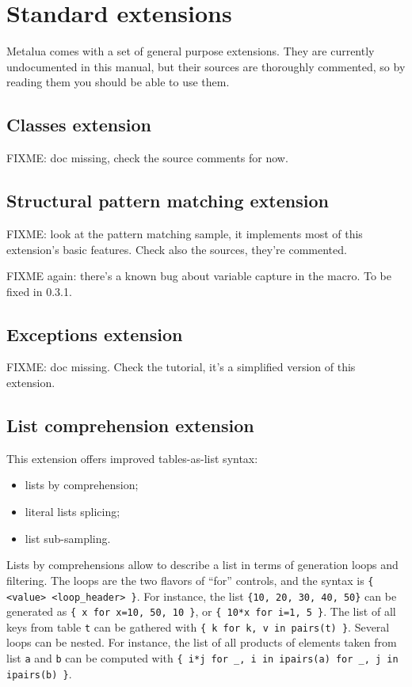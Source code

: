 \section{Standard extensions}
Metalua comes with a set of general purpose extensions. They are
currently undocumented in this manual, but their sources are
thoroughly commented, so by reading them you should be able to use
them.

\subsection{Classes extension}
FIXME: doc missing, check the source comments for now.

\subsection{Structural pattern matching extension}

FIXME: look at the pattern matching sample, it implements most of this
extension's basic features. Check also the sources, they're commented.

FIXME again: there's a known bug about variable capture in the
macro. To be fixed in 0.3.1.

\subsection{Exceptions extension}
FIXME: doc missing. Check the tutorial, it's a simplified version of
this extension.

\subsection{List comprehension extension} 

This extension offers improved tables-as-list syntax:
\begin{itemize}
\item lists by comprehension;
\item literal lists splicing;
\item list sub-sampling.
\end{itemize}

Lists by comprehensions allow to describe a list in terms of
generation loops and filtering. The loops are the two flavors of
``for'' controls, and the syntax is {\tt\{ <value> <loop\_header>
  \}}. For instance, the list {\tt\{10, 20, 30, 40, 50\}} can be generated
as {\tt\{ x for x=10, 50, 10 \}}, or {\tt\{ 10*x for i=1, 5 \}}. The
list of all keys from table {\tt t} can be gathered with {\tt\{ k for
  k, v in pairs(t) \}}. Several loops can be nested. For instance, the
list of all products of elements taken from list {\tt a} and {\tt b}
can be computed with {\tt\{ i*j for \_, i in ipairs(a) for \_, j in
  ipairs(b) \}}.

